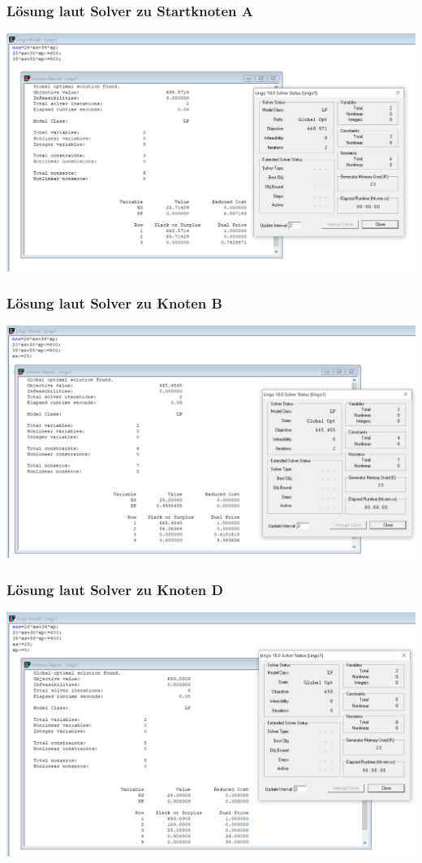 \documentclass[a4paper,11pt]{article}
\begin{document}
\subsubsection*{Lösung laut Solver zu Startknoten A}
\begin{centering}
	\includegraphics[width=0.65\linewidth]{src/blatt_5_aufgabe_2_teilaufgabe_b_knoten_a_loesung_solver.png}
\end{centering}

\subsubsection*{Lösung laut Solver zu Knoten B}
\begin{centering}
	\includegraphics[width=0.65\linewidth]{src/blatt_5_aufgabe_2_teilaufgabe_b_knoten_b_loesung_solver.png}
\end{centering}

\subsubsection*{Lösung laut Solver zu Knoten D}
\begin{centering}
	\includegraphics[width=0.65\linewidth]{src/blatt_5_aufgabe_2_teilaufgabe_b_knoten_d_loesung_solver.png}
\end{centering}
\end{document}
